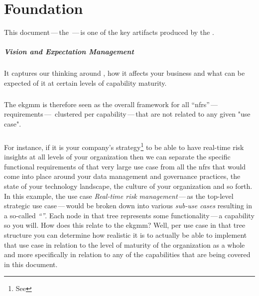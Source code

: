 \chapter{ Foundation}
\label{ch:ekg-foundation}

This document\,---\,the \,---\,is one of the key artifacts produced by the .

\paragraph{Vision and Expectation Management}

It captures our thinking around ,
how it affects your business and what can be expected of it at certain levels of capability maturity.

\paragraph{}

The \gls{ekgmm} is therefore seen as the overall framework for all \enquote{\glspl{nfr}}\,---\,requirements\,---\,%
clustered per capability\,---\,that are not  related to any given "use case".

\paragraph{}

For instance, if it is your company's strategy\footnote{See } to be able to have real-time risk insights at all levels
of your organization then we can separate the specific functional requirements of that very large use case from
all the \glspl{nfr} that would come into place around your data management and governance practices, the state of
your technology landscape, the culture of your organization and so forth.
In this example, the use case \textit{Real-time risk management}\,---\,as the top-level strategic use case\,---\,would
be broken down into various \textit{sub-use cases} resulting in a so-called \textit{\enquote{}}.
Each node in that tree represents some functionality\,---\,a capability so you will.
How does this relate to the \gls{ekgmm}? Well, per use case in that tree structure you can determine how realistic
it is to actually be able to implement that use case in relation to the level of maturity of the organization as a
whole and more specifically in relation to any of the capabilities that are being covered in this document.

